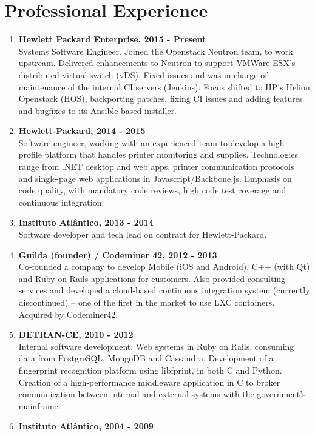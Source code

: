 \documentclass[letterpaper]{article}
\begin{document}
\section*{Professional Experience}

\begin{enumerate}
  \item
  \textbf{Hewlett Packard Enterprise, 2015 - Present} \\
  Systems Software Engineer. Joined the Openstack Neutron team, to work upstream. Delivered enhancements to Neutron to support VMWare ESX's distributed virtual switch (vDS). Fixed issues and was in charge of maintenance of the internal CI servers (Jenkins). Focus shifted to HP's Helion Openstack (HOS), backporting patches, fixing CI issues and adding features and bugfixes to its Ansible-based installer.
  \item 
  \textbf{Hewlett-Packard, 2014 - 2015} \\
  Software engineer, working with an experienced team to develop a high-profile platform that handles printer monitoring and supplies. Technologies range from .NET desktop and web apps, printer communication protocols and single-page web applications in Javascript/Backbone.js. Emphasis on code quality, with mandatory code reviews, high code test coverage and continuous integration.
  \item
  \textbf{Instituto Atlântico, 2013 - 2014} \\
  Software developer and tech lead on contract for Hewlett-Packard.
  \item
  \textbf{Guilda (founder) / Codeminer 42, 2012 - 2013 } \\
  Co-founded a company to develop Mobile (iOS and Android), C++ (with Qt) and Ruby on Rails applications for customers. Also provided consulting services and developed a cloud-based continuous integration system (currently discontinued) – one of the first in the market to use LXC containers. Acquired by Codeminer42.
  \item
  \textbf{DETRAN-CE, 2010 - 2012} \\
  Internal software development. Web systems in Ruby on Rails, consuming data from PostgreSQL, MongoDB and Cassandra. Development of a fingerprint recognition platform using libfprint, in both C and Python. Creation of a high-performance middleware application in C to broker communication between internal and external systems with the government's mainframe.
  \item
  \textbf{Instituto Atlântico, 2004 - 2009 } \\

\end{enumerate}
\end{document}
